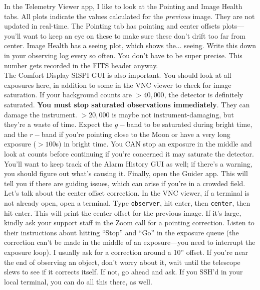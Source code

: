 In the Telemetry Viewer app, I like to look at the Pointing and Image Health tabs. All plots indicate the values calculated for the \textit{previous} image. They are not updated in real-time. The Pointing tab has pointing and center offsets plots---you'll want to keep an eye on these to make sure these don't drift too far from center. Image Health has a seeing plot, which shows the... seeing. Write this down in your observing log every so often. You don't have to be super precise. This number gets recorded in the FITS header anyway. \\

The Comfort Display SISPI GUI is also important. You should look at all exposures here, in addition to some in the VNC viewer to check for image saturation. If your background counts are $>40,000$, the detector is definitely saturated. \textbf{You must stop saturated observations immediately}. They can damage the instrument. $>20,000$ is maybe not instrument-damaging, but they're a waste of time. Expect the $g-$band to be saturated during bright time, and the $r-$band if you're pointing close to the Moon or have a very long exposure ($>100$s) in bright time. You CAN stop an exposure in the middle and look at counts before continuing if you're concerned it may saturate the detector. \\

You'll want to keep track of the Alarm History GUI as well; if there's a warning, you should figure out what's causing it. Finally, open the Guider app. This will tell you if there are guiding issues, which can arise if you're in a crowded field. \\


Let's talk about the center offset correction. In the VNC viewer, if a terminal is not already open, open a terminal. Type \texttt{observer}, hit enter, then \texttt{center}, then hit enter. This will print the center offset for the previous image. If it's large, kindly ask your support staff in the Zoom call for a pointing correction. Listen to their instructions about hitting ``Stop'' and ``Go'' in the exposure queue (the correction can't be made in the middle of an exposure---you need to interrupt the exposure loop). I usually ask for a correction around a 10'' offset. If you're near the end of observing an object, don't worry about it, wait until the telescope slews to see if it corrects itself. If not, go ahead and ask. If you SSH'd in your local terminal, you can do all this there, as well. \\

